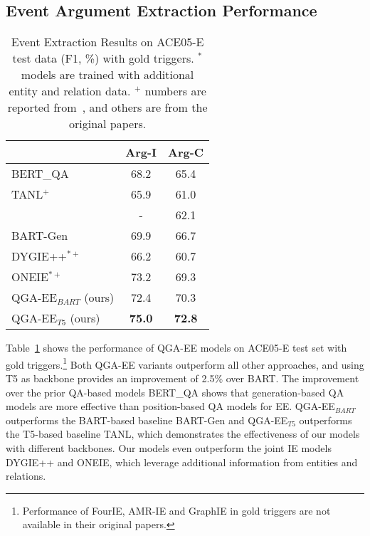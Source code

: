 \subsection{Event Argument Extraction Performance}
\begin{table}[!th]
    \centering
    \small
    \begin{tabular}{l|c|c}
    \hline
    {} & {Arg-I} & {Arg-C}\\
    \hline

         {BERT\_QA~\cite{du2020event}}&{68.2}&{65.4}  \\
         {TANL$^{+}$~\cite{paolini2021structured}}& {65.9} & {61.0}\\
        
         {\citet{ma2020resource}}&{-} & {62.1}\\
         {BART-Gen~\cite{li2021document}}& {69.9} & {66.7}\\
    \hline
    
        {DYGIE++$^{*+}$~\cite{wadden2019entity}}&{66.2}&{60.7}  \\
         {ONEIE$^{*+}$~\cite{lin2020joint}} & {73.2} & {69.3}\\
         \hline
        {QGA-EE$_{BART}$ (ours)} &  {72.4} & {70.3} \\
        {QGA-EE$_{T5}$ (ours)} & {\textbf{75.0}} & {\textbf{72.8}}  \\
    \hline
    \end{tabular}
    \caption{Event Extraction Results on ACE05-E test data (F1, \%) with gold triggers. $^{*}$ models are trained with additional entity and relation data. $^{+}$ numbers are reported from~\citet{hsudegree}, and others are from the original papers.}
    \label{tab:arg_overall_gold}
\end{table}
Table~\ref{tab:arg_overall_gold} shows the performance of QGA-EE models on ACE05-E test set with gold triggers.\footnote{Performance of FourIE, AMR-IE and GraphIE in gold triggers are not available in their original papers.}
Both QGA-EE variants outperform all other approaches, and using T5 as backbone provides an improvement of 2.5\% over BART.
The improvement over the prior QA-based models BERT\_QA shows that generation-based QA models are more effective than position-based QA models for EE.
QGA-EE$_{BART}$ outperforms the BART-based baseline BART-Gen and QGA-EE$_{T5}$ outperforms the T5-based baseline TANL, which demonstrates the effectiveness of our models with different backbones.
Our models even outperform the joint IE models DYGIE++ and ONEIE, which leverage additional information from entities and relations.

